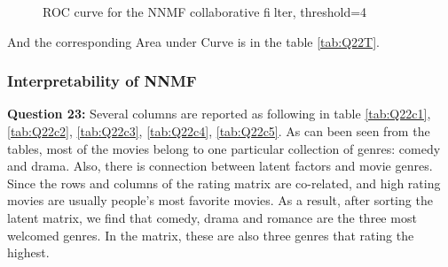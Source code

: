 \documentclass{article}
\begin{document}
\begin{figure}
\centering
{}
\caption{ROC curve for the NNMF collaborative filter, threshold=4} \label{Q224}
\end{figure}

And the corresponding Area under Curve is in the table \ref{tab:Q22T}.

\begin{table}[h]
\center
\caption{AUC values of different thresholds}
\label{tab:Q22T}
\end{table}


\subsubsection{Interpretability of NNMF}

\bigbreak \textbf{Question 23:}
Several columns are reported as following in table \ref{tab:Q22c1}, \ref{tab:Q22c2}, \ref{tab:Q22c3}, \ref{tab:Q22c4}, \ref{tab:Q22c5}. As can been seen from the tables, most of the movies belong to one particular collection of genres: comedy and drama. Also, there is connection between latent factors and movie genres. Since the rows and columns of the rating matrix are co-related, and high rating movies are usually people's most favorite movies. As a result, after sorting the latent matrix, we find that comedy, drama and romance are the three most welcomed genres. In the matrix, these are also three genres that rating the highest. 
\end{document}
